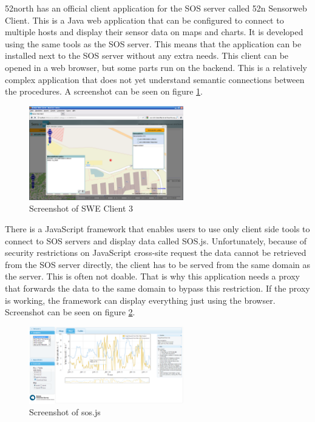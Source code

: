 52north has an official client application for the SOS server called 52n Sensorweb Client. This is a Java web application that can be configured to connect to multiple hosts and display their sensor data on maps and charts. It is developed using the same tools as the SOS server. 
This means that the application can be installed next to the SOS server without any extra needs. This client can be opened in a web browser, but some parts run on the backend. This is a relatively complex application that does not yet understand semantic connections between the procedures. A screenshot can be seen on figure \ref{fig:sweclient}.

\begin{figure}[h]
\centering
\includegraphics[width=0.6\textwidth]{figures/sweclient.png}
\caption{Screenshot of SWE Client 3\label{fig:sweclient}}
\end{figure}

There is a JavaScript framework that enables users to use only client side tools to connect to SOS servers and display data called SOS.js. Unfortunately, because of security restrictions on JavaScript cross-site request the data cannot be retrieved from the SOS server directly, the client has to be served from the same domain as the server. This is often not doable. That is why this application needs a proxy that forwards the data to the same domain to bypass this restriction. If the proxy is working, the framework can display everything just using the browser. Screenshot can be seen on figure \ref{fig:sos-js}.

\begin{figure}[h]
\centering
\includegraphics[width=0.6\textwidth]{figures/sos-js.png}
\caption{Screenshot of sos.js\label{fig:sos-js}}
\end{figure}

